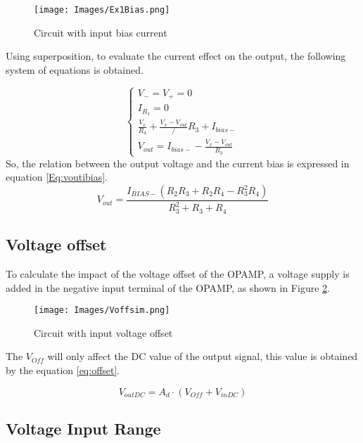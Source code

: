 \begin{figure}[H]
    \centering
    \texttt{[image: Images/Ex1Bias.png]}
    \caption{Circuit with input bias current}
    \label{Ex1Bias}
\end{figure}

Using superposition, to evaluate the current effect on the output, the following system of equations is obtained.


\begin{equation}
    \begin{cases}
    
        V_- = V_+ = 0 \\
        I_{R_1} = 0\\
        \frac{V_x}{R_4} + \frac{V_x - V_{out}}/R_3 + I_{bias-}\\
        V_{out} = I_{bias-} - \frac{V_x - V_{out}}{R_3}

    \end{cases}
\end{equation}
So, the relation between the output voltage and the current bias is expressed in equation \ref{Eq:voutibias}.
\begin{equation}
    V_{out} = \frac{I_{BIAS-} \left(R_{2} R_{3} + R_{2} R_{4} - R_{3}^{2} R_{4}\right)}{R_{3}^{2} + R_{3} + R_{4}}
    \label{Eq:voutibias}
\end{equation}

\subsection{Voltage offset}

To calculate the impact of the voltage offset of the OPAMP, a voltage supply is added in the negative input terminal of the OPAMP, as shown in Figure \ref{Ex1offset}.

\begin{figure}[H]
    \centering
    \texttt{[image: Images/Voffsim.png]}
    \caption{Circuit with input voltage offset}
    \label{Ex1offset}
\end{figure}

The $V_{Off}$ will only affect the DC value of the output signal, this value is obtained by the equation \ref{eq:offset}.

\begin{equation}
    V_{outDC} = A_d \cdot (V_{Off} + V_{inDC})
    \label{eq:offset}
\end{equation}
\subsection{Voltage Input Range}

